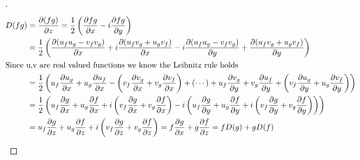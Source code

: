 \documentclass{article}
\begin{document}
  \begin{proof}[\unskip \nopunct]
    \begin{align*}
      D(fg)  &= \frac{\partial (fg)}{\partial z} = \frac{1}{2}\left(\frac{\partial fg}{\partial x} - i\frac{\partial fg}{\partial y} \right) \\
      &= \frac{1}{2}\left(\frac{\partial (u_fu_g - v_fv_g)}{\partial x} + i\frac{\partial (u_fv_g + u_gv_f)}{\partial x} - i\frac{\partial (u_fu_g - v_fv_g)}{\partial y} + \frac{\partial (u_fv_g + u_gv_f)}{\partial y} \right) \\
      \intertext{Since u,v are real valued functions we know the Leibnitz rule holds}
      &= \frac{1}{2}\left(u_f\frac{\partial u_g}{\partial x} + u_g\frac{\partial u_f}{\partial x} - \left(v_f\frac{\partial v_g}{\partial x} + v_g\frac{\partial v_f}{\partial x}\right) + (\cdots) + u_f\frac{\partial v_g}{\partial y} + v_g\frac{\partial u_f}{\partial y} + \left(v_f\frac{\partial u_g}{\partial y} + u_g\frac{\partial v_f}{\partial y} \right)\right) \\
      &= \frac{1}{2}\left(u_f\frac{\partial g}{\partial x} + u_g\frac{\partial f}{\partial x}  + i\left( v_f\frac{\partial g}{\partial x} + v_g\frac{\partial f}{\partial x}\right)  -i\left( u_f\frac{\partial g}{\partial y} + u_g\frac{\partial f}{\partial y}  + i\left( v_f\frac{\partial g}{\partial y} + v_g\frac{\partial f}{\partial y}\right)\right)\right) \\
      &= u_f\frac{\partial g}{\partial z} + u_g\frac{\partial f}{\partial z} + i\left(v_f\frac{\partial g}{\partial z} + v_g\frac{\partial f}{\partial z}\right) = f\frac{\partial g}{\partial x} + g\frac{\partial f}{\partial z} = fD(g) + gD(f)
    \end{align*}
  \end{proof}
\end{document}
